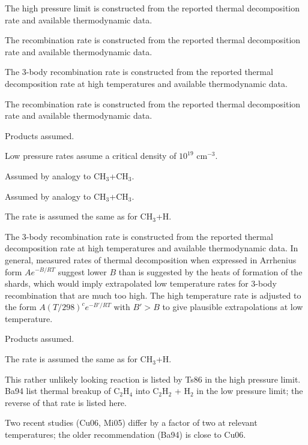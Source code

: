 \documentclass[12pt,landscape]{article}
\newcounter{reaction}
\begin{document}
 The high pressure limit is constructed from the reported thermal decomposition rate and available thermodynamic data. 

 The recombination rate is constructed from the reported thermal decomposition rate and available thermodynamic data. 

 The 3-body recombination rate is constructed from the reported thermal decomposition rate at high temperatures and available thermodynamic data. 

 The recombination rate is constructed from the reported thermal decomposition rate and available thermodynamic data. 

 Products assumed.

  Low pressure rates assume a critical density of $10^{19}$ cm$^{-3}$. 

  Assumed by analogy to CH$_3$+CH$_3$.

  Assumed by analogy to CH$_3$+CH$_3$.

  The rate is assumed the same as for CH$_3$+H.

 The 3-body recombination rate is constructed from the reported thermal decomposition rate at high temperatures and available thermodynamic data.  In general, measured rates of thermal decomposition when expressed in Arrhenius form $Ae^{-B/RT}$ suggest lower $B$ than is suggested by the heats of formation of the shards, which would imply extrapolated low temperature rates for 3-body recombination that are much too high.  The high temperature rate is adjusted to the form $A\left(T/298\right)^c e^{-B'/RT}$ with $B'>B$ to give plausible extrapolations at low temperature. 

  Products assumed.

 The rate is assumed the same as for CH$_3$+H.

 This rather unlikely looking reaction is listed by Ts86 in the high pressure limit.  Ba94 list thermal breakup of C$_2$H$_4$ into C$_2$H$_2$ + H$_2$ in the low pressure limit; the reverse of that rate is listed here.  

 Two recent studies (Cu06, Mi05) differ by a factor of two at relevant temperatures; the older recommendation (Ba94) is close to Cu06.  
\end{document}
